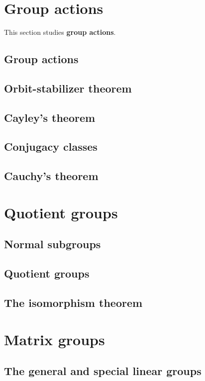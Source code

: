 \documentclass[main.tex]{subfiles}
\begin{document}
		\section{Group actions}
		This section studies \textbf{group actions}.
			\subsection{Group actions}
			
			\subsection{Orbit-stabilizer theorem}
			
			\subsection{Cayley's theorem}
			
			\subsection{Conjugacy classes}
			
			\subsection{Cauchy's theorem}
			
		\section{Quotient groups}
			\subsection{Normal subgroups}
			
			\subsection{Quotient groups}
			
			\subsection{The isomorphism theorem}
			
		\section{Matrix groups}
			\subsection{The general and special linear groups}
			
\end{document}
